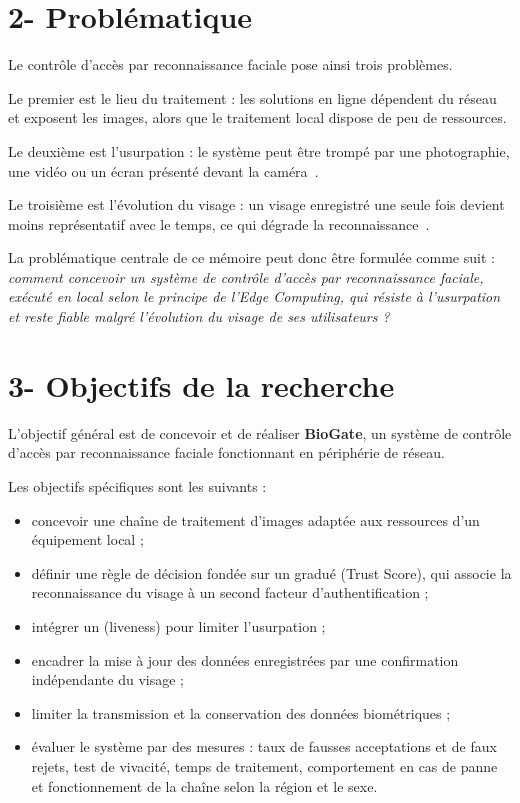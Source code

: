 \section*{2- Problématique}

\begin{maj}
Le contrôle d'accès par reconnaissance faciale pose ainsi trois problèmes.

Le premier est le lieu du traitement : les solutions en ligne dépendent du réseau et exposent les images, alors que le traitement local dispose de peu de ressources.

Le deuxième est l'usurpation : le système peut être trompé par une photographie, une vidéo ou un écran présenté devant la caméra~\cite{chakraborty2014overview,iso30107}.

Le troisième est l'évolution du visage : un visage enregistré une seule fois devient moins représentatif avec le temps, ce qui dégrade la reconnaissance~\cite{bestrowden2018longitudinal,pisani2019adaptive}.

La problématique centrale de ce mémoire peut donc être formulée comme suit : \textit{comment concevoir un système de contrôle d'accès par reconnaissance faciale, exécuté en local selon le principe de l'Edge Computing, qui résiste à l'usurpation et reste fiable malgré l'évolution du visage de ses utilisateurs ?}
\end{maj}

\section*{3- Objectifs de la recherche}

\begin{maj}
L'objectif général est de concevoir et de réaliser \textbf{BioGate}, un système de contrôle d'accès par reconnaissance faciale fonctionnant en périphérie de réseau.

Les objectifs spécifiques sont les suivants :
\begin{itemize}
  \item concevoir une chaîne de traitement d'images adaptée aux ressources d'un équipement local ;
  \item définir une règle de décision fondée sur un  gradué (Trust Score), qui associe la reconnaissance du visage à un second facteur d'authentification ;
  \item intégrer un  (liveness) pour limiter l'usurpation ;
  \item encadrer la mise à jour des données enregistrées par une confirmation indépendante du visage ;
  \item limiter la transmission et la conservation des données biométriques ;
  \item évaluer le système par des mesures : taux de fausses acceptations et de faux rejets, test de vivacité, temps de traitement, comportement en cas de panne et fonctionnement de la chaîne selon la région et le sexe.
\end{itemize}
\end{maj}

